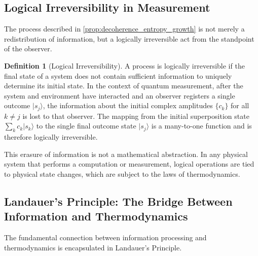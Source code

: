 \documentclass[11pt, letterpaper]{report}
\theoremstyle{plain} %
\theoremstyle{definition} %
\newtheorem{definition}{Definition}[chapter]
\theoremstyle{remark} %
\begin{document}
\subsection{Logical Irreversibility in Measurement}
The process described in \cref{prop:decoherence_entropy_growth} is not merely a redistribution of information, but a logically irreversible act from the standpoint of the observer.

\begin{definition}[Logical Irreversibility]
A process is logically irreversible if the final state of a system does not contain sufficient information to uniquely determine its initial state. In the context of quantum measurement, after the system and environment have interacted and an observer registers a single outcome $|s_j\rangle$, the information about the initial complex amplitudes $\{c_k\}$ for all $k \neq j$ is lost to that observer. The mapping from the initial superposition state $\sum_k c_k |s_k\rangle$ to the single final outcome state $|s_j\rangle$ is a many-to-one function and is therefore logically irreversible.
\end{definition}

This erasure of information is not a mathematical abstraction. In any physical system that performs a computation or measurement, logical operations are tied to physical state changes, which are subject to the laws of thermodynamics.

\subsection{Landauer's Principle: The Bridge Between Information and Thermodynamics}
The fundamental connection between information processing and thermodynamics is encapsulated in Landauer's Principle.
\end{document}
